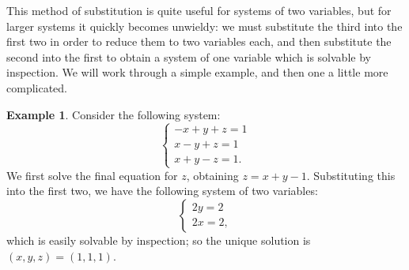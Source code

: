 \documentclass[a4paper,leqno]{article}
\numberwithin{equation}{section}
\theoremstyle{definition}
\newtheorem{ex}[equation]{Example}
\theoremstyle{remark}
\begin{document}
This method of substitution is quite useful for systems of two variables, but for larger systems it quickly becomes unwieldy: we must substitute
the third into the first two in order to reduce them to two variables each, and then substitute the second into the first to obtain a system
of one variable which is solvable by inspection. We will work through a simple example, and then one a little more complicated.

\begin{ex}
  Consider the following system:
  \begin{equation}
    \begin{cases}
      - x + y + z = 1\\
      x - y + z = 1\\
      x + y - z = 1.
    \end{cases}
  \end{equation}
  We first solve the final equation for $ z $, obtaining $ z = x + y - 1 $. Substituting this into the first two,
  we have the following system of two variables:
  \begin{equation}
    \begin{cases}
      2y = 2\\
      2x = 2,
    \end{cases}
  \end{equation}
  which is easily solvable by inspection; so the unique solution is $ (x,y,z) = (1,1,1) $.
\end{ex}
\end{document}
